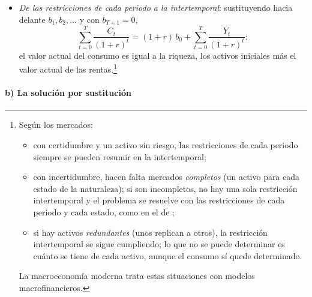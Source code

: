 \documentclass[11pt]{article}
\begin{document}
\begin{itemize}
  En el óptimo, $b_{T+1}=0$.
\item \emph{De las restricciones de cada periodo a la intertemporal}: sustituyendo hacia delante $b_1,b_2,\dots$ y con $b_{T+1}=0$,
  \begin{equation}
  \sum_{t=0}^{T}\frac{C_t}{(1+r)^t}=(1+r)\,b_0+\sum_{t=0}^{T}\frac{Y_t}{(1+r)^t}:\label{eq:restriccion-intertemporal}
  \end{equation}
  el valor actual del consumo es igual a la riqueza, los activos iniciales más el valor actual de las rentas.\footnote{Según los mercados:
\begin{itemize}
\item con certidumbre y un activo sin riesgo, las restricciones de cada periodo siempre se pueden resumir en la intertemporal;
\item con incertidumbre, hacen falta mercados \emph{completos} (un activo para cada estado de la naturaleza); si son incompletos, no hay una sola restricción intertemporal y el problema se resuelve con las restricciones de cada periodo y cada estado, como en el de  ;
\item si hay activos \emph{redundantes} (unos replican a otros), la restricción intertemporal se sigue cumpliendo; lo que no se puede determinar es cuánto se tiene de cada activo, aunque el consumo sí quede determinado.
\end{itemize}
La macroeconomía moderna trata estas situaciones con modelos macrofinancieros.}
\end{itemize}

\paragraph{b) La solución por sustitución}
\end{document}
